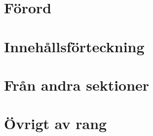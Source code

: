 \documentclass[8pt,twoside]{extreport} %
\begin{document}
\chapter{Förord}



\newpage

\chapter{Innehållsförteckning}
\makeatletter
{}
\makeatother

\newpage

















\chapter{Från andra sektioner}

\newpage





\newpage


\chapter{Övrigt av rang}
\end{document}
